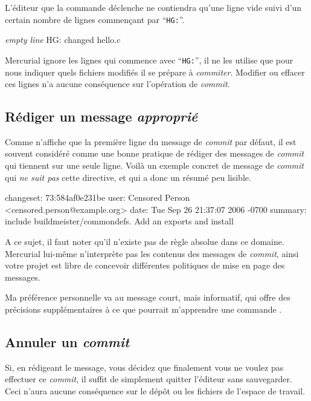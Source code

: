 L'éditeur que la commande  déclenche ne contiendra
qu'une ligne vide suivi d'un certain nombre de lignes commençant
par ``\texttt{HG:}''.
\begin{codesample2}
  \emph{empty line}
  HG: changed hello.c
\end{codesample2}
Mercurial ignore les lignes qui commence avec ``\texttt{HG:}'', il 
ne les utilise que pour nous indiquer quels fichiers modifiés il se 
prépare à \textit{commiter}. Modifier ou effacer ces lignes n'a 
aucune conséquence sur l'opération de \textit{commit}.

\subsection{Rédiger un message \textit{approprié}}

Comme  n'affiche que la première ligne du message de
\textit{commit} par défaut, il est souvent considéré comme une bonne
pratique de rédiger des messages de \textit{commit} qui tiennent
sur une seule ligne. Voilà un exemple concret de message de 
\textit{commit} qui \emph{ne suit pas} cette directive, et qui a donc
un résumé peu lisible.
\begin{codesample2}
  changeset:   73:584af0e231be
  user:        Censored Person <censored.person@example.org>
  date:        Tue Sep 26 21:37:07 2006 -0700
  summary:     include buildmeister/commondefs.   Add an exports and install
\end{codesample2}

A ce sujet, il faut noter qu'il n'existe pas de règle absolue dans ce 
domaine. Mercurial lui-même n'interprète pas les contenus des messages
de \textit{commit}, ainsi votre projet est libre de concevoir différentes
politiques de mise en page des messages.

Ma préférence personnelle va au message court, mais informatif, qui offre
des précisions supplémentaires à ce que pourrait m'apprendre une commande
.

\subsection{Annuler un \textit{commit}}

Si, en rédigeant le message, vous décidez que finalement vous ne 
voulez pas effectuer ce \textit{commit}, il suffit de simplement quitter
l'éditeur sans sauvegarder. Ceci n'aura aucune conséquence sur le dépôt ou
les fichiers de l'espace de travail.

